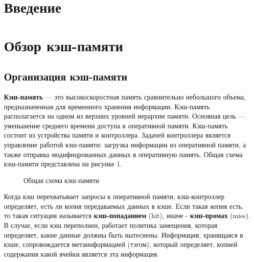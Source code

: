 \documentclass[13pt]{article}
\begin{document}
	\thispagestyle{empty}
	\newpage
	\tableofcontents
	\newpage
	\section*{Введение}
	\newpage
	\section{Обзор кэш-памяти}
	\subsection{Организация кэш-памяти}
	\textbf{Кэш-память} --- это высокоскоростная память сравнительно небольшого объема, предназначенная для временного хранения информации. Кэш-память располагается на одном из верхних уровней иерархии памяти. Основная цель --- уменьшение среднего времени доступа к оперативной памяти. 
	Кэш-память состоит из устройства памяти и контроллера. Задачей контроллера является управление работой кэш-памяти: загрузка информации из оперативной памяти, а также отправка модифицрованных данных в оперативную память. Общая схема кэш-памяти представлена на рисунке 1.
	\begin{figure}[h!]
		\caption{Общая схема кэш-памяти}
	\end{figure}
	
	Когда кэш перехватывает запросы к оперативной памяти, кэш-контроллер определяет, есть ли копия передаваемых данных в кэше. Если такая копия есть, то такая ситуация называется \textbf{кэш-попаданием} (hit), иначе - \textbf{кэш-промах} (miss). В случае, если кэш переполнен, работает политика замещения, которая определяет, какие данные должны быть вытеснены. Информация, хранящаяся в кэше, сопровождается метаинформацией (тэгом), который определяет, копией содержания какой ячейки является эта информация.
	
\end{document}
